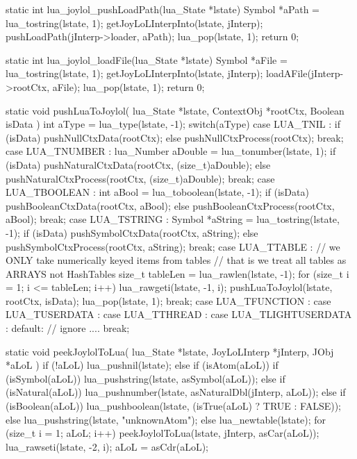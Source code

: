 static int lua_joylol_pushLoadPath(lua_State *lstate) {
  Symbol *aPath = lua_tostring(lstate, 1);
  getJoyLoLInterpInto(lstate, jInterp);
  pushLoadPath(jInterp->loader, aPath);
  lua_pop(lstate, 1);
  return 0;
}

static int lua_joylol_loadFile(lua_State *lstate) {
  Symbol *aFile = lua_tostring(lstate, 1);
  getJoyLoLInterpInto(lstate, jInterp);
  loadAFile(jInterp->rootCtx, aFile);
  lua_pop(lstate, 1);
  return 0;
}
\stopCCode

\startCCode
static void pushLuaToJoylol(
  lua_State  *lstate,
  ContextObj *rootCtx,
  Boolean     isData
) {
  int aType = lua_type(lstate, -1);
  switch(aType) {
  case LUA_TNIL : {
    if (isData) {
      pushNullCtxData(rootCtx);
    } else {
      pushNullCtxProcess(rootCtx);
    }
  } break;
  case LUA_TNUMBER : {
    lua_Number aDouble = lua_tonumber(lstate, 1);
    if (isData) {
      pushNaturalCtxData(rootCtx, (size_t)aDouble);
    } else {
      pushNaturalCtxProcess(rootCtx, (size_t)aDouble);
    }
  } break;
  case LUA_TBOOLEAN : {
    int aBool = lua_toboolean(lstate, -1);
    if (isData) {
      pushBooleanCtxData(rootCtx, aBool);
    } else {
      pushBooleanCtxProcess(rootCtx, aBool);
    }
  } break;
  case LUA_TSTRING : {
    Symbol *aString = lua_tostring(lstate, -1);
    if (isData) {
      pushSymbolCtxData(rootCtx, aString);
    } else {
      pushSymbolCtxProcess(rootCtx, aString);
    }
  } break;
  case LUA_TTABLE : {
    // we ONLY take numerically keyed items from tables
    // that is we treat all tables as ARRAYS not HashTables
    size_t tableLen = lua_rawlen(lstate, -1);
    for (size_t i = 1; i <= tableLen; i++) {
      lua_rawgeti(lstate, -1, i);
      pushLuaToJoylol(lstate, rootCtx, isData);
      lua_pop(lstate, 1);
    }
  } break;
  case LUA_TFUNCTION :
  case LUA_TUSERDATA :
  case LUA_TTHREAD :
  case LUA_TLIGHTUSERDATA :
  default:
    // ignore ....
    break;
  }
}
\stopCCode

\startCCode
static void peekJoylolToLua(
  lua_State    *lstate,
  JoyLoLInterp *jInterp,
  JObj         *aLoL
) {
  if (!aLoL) {
    lua_pushnil(lstate);
  } else if (isAtom(aLoL)) {
    if (isSymbol(aLoL)) {
      lua_pushstring(lstate, asSymbol(aLoL));
    } else if (isNatural(aLoL)) {
      lua_pushnumber(lstate, asNaturalDbl(jInterp, aLoL));
    } else if (isBoolean(aLoL)) {
      lua_pushboolean(lstate, (isTrue(aLoL) ? TRUE : FALSE));
    } else {
      lua_pushstring(lstate, "unknownAtom");
    }
  } else {
    lua_newtable(lstate);
    for (size_t i = 1; aLoL; i++) {
      peekJoylolToLua(lstate, jInterp, asCar(aLoL));
      lua_rawseti(lstate, -2, i);
      aLoL = asCdr(aLoL);
    }
  }
}
\stopCCode


